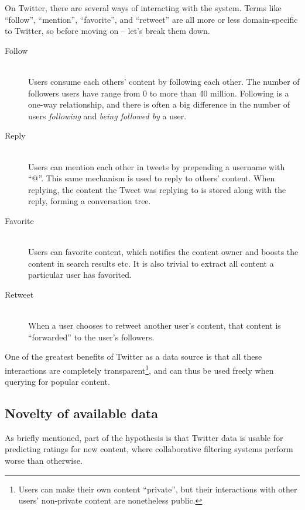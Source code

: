 On Twitter, there are several ways of interacting with the system. Terms like ``follow'', ``mention'', ``favorite'', and ``retweet'' are all more or less domain-specific to Twitter, so before moving on -- let's break them down.

\begin{description}
  \item[Follow] \hfill \\
    Users consume each others' content by following each other. The number of followers users have range from 0 to more than 40 million. Following is a one-way relationship, and there is often a big difference in the number of users \emph{following} and \emph{being followed by} a user.
  \item[Reply] \hfill \\
    Users can mention each other in tweets by prepending a username with ``@''. This same mechanism is used to reply to others' content. When replying, the content the Tweet was replying to is stored along with the reply, forming a conversation tree.
  \item[Favorite] \hfill \\
    Users can favorite content, which notifies the content owner and boosts the content in search results etc. It is also trivial to extract all content a particular user has favorited.
  \item[Retweet] \hfill \\
    When a user chooses to retweet another user's content, that content is ``forwarded'' to the user's followers.
\end{description}

One of the greatest benefits of Twitter as a data source is that all these interactions are completely transparent\footnote{Users can make their own content ``private'', but their interactions with other users' non-private content are nonetheless public.}, and can thus be used freely when querying for popular content.


\subsection{Novelty of available data} %
\label{sub:novelty_of_available_data}

As briefly mentioned, part of the hypothesis is that Twitter data is usable for predicting ratings for new content, where collaborative filtering systems perform worse than otherwise.

